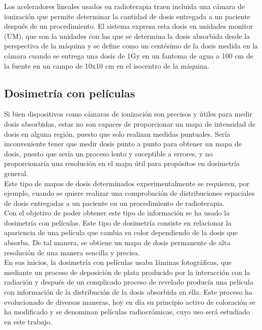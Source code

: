 Los aceleradores lineales usados en radioterapia traen incluida una cámara de ionización que permite determinar la cantidad de dosis entregada a un paciente después de un procedimiento. El sistema expresa esta dosis en unidades monitor (UM), que son la unidades con las que se determina la dosis absorbida desde la perspectiva de la máquina y se define como un centésimo de la dosis medida en la cámara cuando se entrega una dosis de 1Gy en un fantoma de agua a 100 cm de la fuente en un campo de 10x10 cm en el isocentro de la máquina.

\subsection{Dosimetría con películas}
Si bien dispositivos como cámaras de ionización son precisos y útiles para medir dosis absorbidas, estas no son capaces de proporcionar un mapa de intensidad de dosis en alguna región, puesto que solo realizan medidas puntuales. Sería inconveniente tener que medir dosis punto a punto para obtener un mapa de dosis, puesto que sería un proceso lento y suceptible a errores, y no proporcionaría una resolución en el mapa útil para propósitos en dosimetría general. \\

Este tipo de mapas de dosis determinados experimentalmente se requieren, por ejemplo, cuando se quiere realizar una comprobación de distribuciones espaciales de dosis entregadas a un paciente en un procedimiento de radioterapia.\\

Con el objetivo de poder obtener este tipo de información se ha usado la dosimetría con películas. Este tipo de dosimetría consiste en relacionar la apariencia de una película que cambia su color dependiendo de la dosis que absorba. De tal manera, se obtiene un mapa de dosis permanente de alta resolución de una manera sencilla y precisa.\\

En sus inicios, la dosimetría con películas usaba láminas fotográficas, que mediante un proceso de deposición de plata producido por la interacción con la radiación y después de un complicado proceso de revelado producía una película con información de la distribución de la dosis absorbida en ella. Este proceso ha evolucionado de diversas maneras, hoy en día su principio activo de coloración se ha modificado y se denominan películas radiocrómicas, cuyo uso será estudiado en este trabajo.\\


